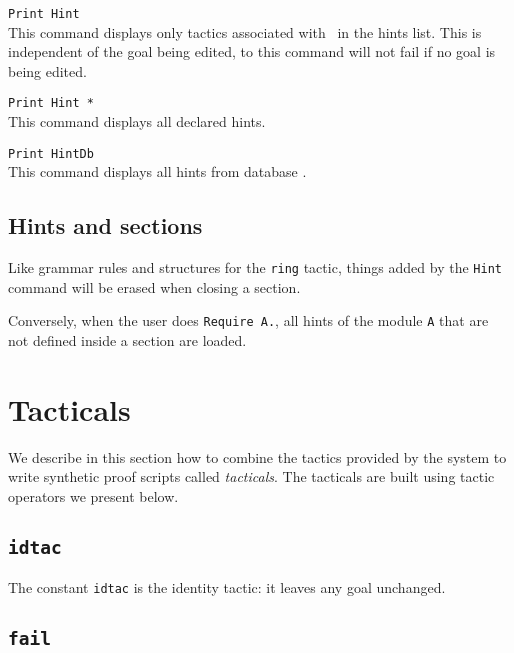 \begin{Variants}
\item {\tt  Print Hint {\ident} }\\
 This command displays only tactics associated with \ident\ in the
 hints list. This is independent of the goal being edited, to this
 command will not fail if no goal is being edited.

\item {\tt Print Hint *}\\
  This command displays all declared hints. 

\item {\tt  Print HintDb {\ident} }\\
\label{PrintHintDb}
 This command displays all hints from database \ident.
\end{Variants}


\subsection{Hints and sections}
\label{Hint-and-Section}

Like grammar rules and structures for the \texttt{ring} tactic, things 
added by the \texttt{Hint} command will be erased when closing a
section.

Conversely, when the user does \texttt{Require A.}, all hints 
of the module \texttt{A} that are not defined inside a section are
loaded.

\section{Tacticals}
\label{Tacticals}
We describe in this section how to combine the tactics provided by the
system to write synthetic proof scripts called {\em tacticals}. The
tacticals are built using tactic operators we present below.

\subsection{\tt idtac}
 The constant {\tt idtac} is the
identity tactic: it leaves any goal unchanged.

\subsection{\tt fail}

